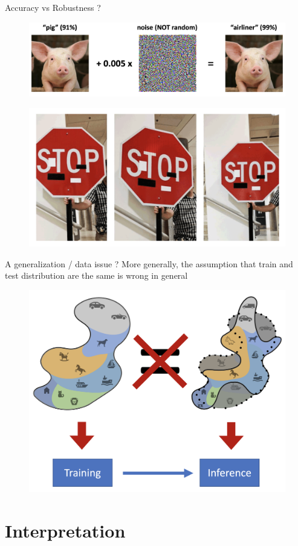 \documentclass{beamer}
\begin{document}
\begin{frame}{Accuracy vs Robustness ?}
    \begin{figure}[H]
    \centering
    \includegraphics[width=0.8\linewidth]{images/pig_attack.png}
    \end{figure}
    
    \begin{figure}[H]
    \centering
    \includegraphics[width=0.6\linewidth]{images/stop_sign.png}
    \end{figure}
\end{frame}

\begin{frame}{A generalization / data issue ?}
    More generally, the assumption that train and test distribution are the same is wrong in general
    \begin{figure}[H]
    \centering
    \includegraphics[width=0.6\linewidth]{images/distribution_mismatch.png}
    \end{figure}
    
    
\end{frame}

\section{Interpretation}
\end{document}
